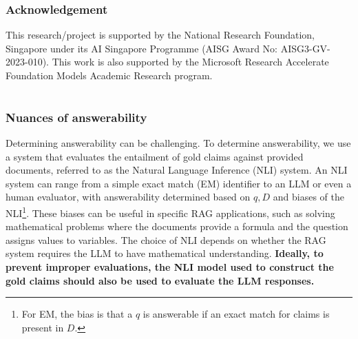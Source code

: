 \documentclass{article} %
\newcommand{\method}[0]{\textsc{Trust-Align}}
\newcommand{\metric}[0]{\textsc{Trust-Score}}
\begin{document}
\section*{Acknowledgement}
This research/project is supported by the National Research Foundation, Singapore under its AI Singapore Programme (AISG Award No: AISG3-GV-2023-010). This work is also supported by the Microsoft Research Accelerate Foundation Models Academic Research program.



\newpage
\appendix
{} %
\part{} %
\parttoc %
\clearpage
\section{Nuances of answerability}\label{nuances_of_ans}
Determining answerability can be challenging. To determine answerability, we use a system that evaluates the entailment of gold claims against provided documents, referred to as the Natural Language Inference (NLI) system. An NLI system can range from a simple exact match (EM) identifier to an LLM or even a human evaluator, with answerability determined based on $q, D$ and biases of the NLI\footnote{For EM, the bias is that a $q$ is answerable if an exact match for claims is present in $D$.}. These biases can be useful in specific RAG applications, such as solving mathematical problems where the documents provide a formula and the question assigns values to variables. The choice of NLI depends on whether the RAG system requires the LLM to have mathematical understanding. \textbf{Ideally, to prevent improper evaluations, the NLI model used to construct the gold claims should also be used to evaluate the LLM responses.}
\end{document}
